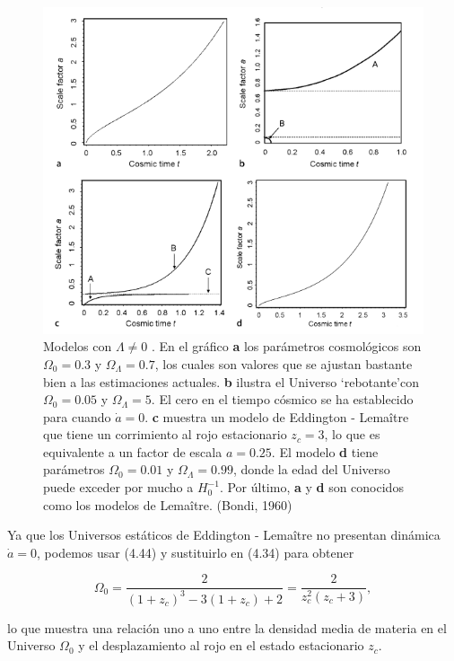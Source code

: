 \documentclass[11pt]{article}
\begin{document}
     \begin{figure}[H]         
     \centering
     \includegraphics[width=1.0\textwidth]{graficos73_pp226Mlalcon.png}
        \caption{\footnotesize{Modelos con $\Lambda \neq 0$ }. En el gráfico {\bf{a}} los parámetros cosmológicos son $\Omega_0=0.3$ y $\Omega_{\Lambda}= 0.7$, los cuales son valores que se ajustan bastante bien a las estimaciones actuales. {\bf{b}} ilustra el Universo `rebotante'con $\Omega_0 = 0.05$ y $\Omega_{\Lambda}=5$. El cero en el tiempo cósmico se ha establecido para cuando $\dot{a}=0$. {\bf{c}} muestra un modelo de Eddington - Lema\^itre que tiene un corrimiento al rojo estacionario $z_c = 3$, lo que es equivalente a un factor de escala $a=0.25$. El modelo {\bf{d}} tiene parámetros $\Omega_0 = 0.01$ y $\Omega_{\Lambda}= 0.99$, donde la edad del Universo puede exceder por mucho a $H_0^{-1}$. Por último, {\bf{a}} y {\bf{d}} son conocidos como los modelos de Lema\^itre. (Bondi, 1960)}
     \end{figure}
    
    
    Ya que los Universos estáticos de Eddington - Lema\^itre no presentan dinámica $\dot{a}=0$, podemos usar (4.44) y sustituirlo en (4.34) para obtener
    
    \begin{equation}
        \Omega_0 = \frac{2}{ (1 + z_c)^3 - 3  (1 + z_c) + 2} = \frac{2}{ z_c^2(z_c + 3)},
    \end{equation}
    
    lo que muestra una relación uno a uno entre la densidad media de materia en el Universo $\Omega_0$ y el desplazamiento al rojo en el estado estacionario $z_c$.
    
\end{document}
